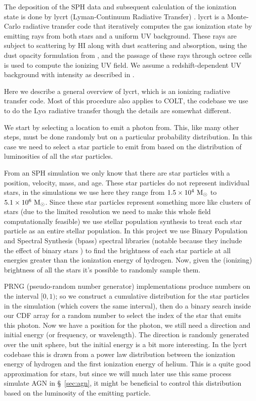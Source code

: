 The deposition of the SPH data and subsequent calculation of the ionization state is done by {\sc lycrt} (Lyman-Continuum Radiative Transfer) \citep{Ma2015}.
{\sc lycrt} is a Monte-Carlo radiative transfer code that iteratively computes the gas ionization state by emitting rays from both stars and a uniform UV background.
These rays are subject to scattering by HI along with dust scattering and absorption, using the dust opacity formulation from \citet{Li2001}, and the passage of these rays through octree cells is used to compute the ionizing UV field.
We assume a redshift-dependent UV background with intensity as described in \citet{Faucher-Giguere2009}.

Here we describe a general overview of {\sc lycrt}, which is an ionizing radiative transfer code.
Most of this procedure also applies to {\sc COLT}, the codebase we use to do the Ly$\alpha$ radiative transfer though the details are somewhat different.

We start by selecting a location to emit a photon from.
This, like many other steps, must be done randomly but on a particular probability distribution.
In this case we need to select a star particle to emit from based on the distribution of luminosities of all the star particles.

From an SPH simulation we only know that there are star particles with a position, velocity, mass, and age.
These star particles do not represent individual stars, in the simulations we use here they range from $1.5\times10^{4}\ \rm{M}_{\odot}$ to $5.1\times10^{6}\ \rm{M}_{\odot}$.
Since these star particles represent something more like clusters of stars (due to the limited resolution we need to make this whole field computationally feasible) we use stellar population synthesis to treat each star particle as an entire stellar population.
In this project we use Binary Population and Spectral Synthesis ({\sc bpass}) spectral libraries (notable because they include the effect of binary stars \citep{Eldridge2008}) to find the brightness of each star particle at all energies greater than the ionization energy of hydrogen.
Now, given the (ionizing) brightness of all the stars it's possible to randomly sample them.

PRNG (pseudo-random number generator) implementations produce numbers on the interval $[0, 1)$; so we construct a cumulative distribution for the star particles in the simulation (which covers the same interval), then do a binary search inside our CDF array for a random number to select the index of the star that emits this photon.
Now we have a position for the photon, we still need a direction and initial energy (or frequency, or wavelength).
The direction is randomly generated over the unit sphere, but the initial energy is a bit more interesting.
In the {\sc lycrt} codebase this is drawn from a power law distribution between the ionization energy of hydrogen and the first ionization energy of helium.
This is a quite good approximation for stars, but since we will much later use this same process simulate AGN in \S~\ref{sec:agn}, it might be beneficial to control this distribution based on the luminosity of the emitting particle.

